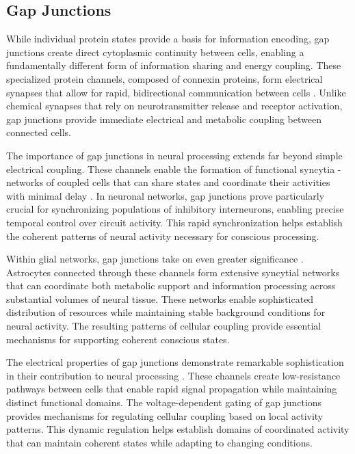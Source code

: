 \begin{refsection}
\section{Gap Junctions}

While individual protein states provide a basis for information encoding, gap junctions create direct cytoplasmic continuity between cells, enabling a fundamentally different form of information sharing and energy coupling. These specialized protein channels, composed of connexin proteins, form electrical synapses that allow for rapid, bidirectional communication between cells \cite{Giaume1996}. Unlike chemical synapses that rely on neurotransmitter release and receptor activation, gap junctions provide immediate electrical and metabolic coupling between connected cells.

The importance of gap junctions in neural processing extends far beyond simple electrical coupling. These channels enable the formation of functional syncytia - networks of coupled cells that can share states and coordinate their activities with minimal delay \cite{Bennett2004}. In neuronal networks, gap junctions prove particularly crucial for synchronizing populations of inhibitory interneurons, enabling precise temporal control over circuit activity. This rapid synchronization helps establish the coherent patterns of neural activity necessary for conscious processing.

Within glial networks, gap junctions take on even greater significance \cite{Dermietzel2013}. Astrocytes connected through these channels form extensive syncytial networks that can coordinate both metabolic support and information processing across substantial volumes of neural tissue. These networks enable sophisticated distribution of resources while maintaining stable background conditions for neural activity. The resulting patterns of cellular coupling provide essential mechanisms for supporting coherent conscious states.

The electrical properties of gap junctions demonstrate remarkable sophistication in their contribution to neural processing \cite{Connors2004}. These channels create low-resistance pathways between cells that enable rapid signal propagation while maintaining distinct functional domains. The voltage-dependent gating of gap junctions provides mechanisms for regulating cellular coupling based on local activity patterns. This dynamic regulation helps establish domains of coordinated activity that can maintain coherent states while adapting to changing conditions.


\end{refsection}
